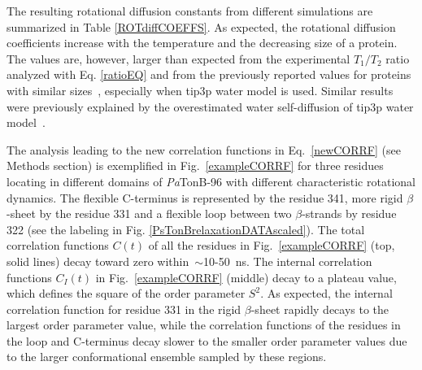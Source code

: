 \documentclass[journal=jpcbfk,manuscript=article]{achemso}
\begin{document}
The resulting rotational diffusion constants from different simulations are
summarized in Table \ref{ROTdiffCOEFFS}.
As expected, the rotational diffusion coefficients
increase with the temperature and the decreasing size of a protein.
The values are, however, larger than 
expected from the experimental $T_1/T_2$ ratio analyzed with Eq. \ref{ratioEQ}
and from the previously reported values for proteins with similar
sizes~\cite{krishnan98}, especially when tip3p water model is used.
Similar results were previously explained by the overestimated water
self-diffusion of tip3p water model~\cite{wong08,takemura12,debiec16}.

The analysis leading to the new correlation functions in Eq.~\ref{newCORRF}
(see Methods section) is exemplified in
Fig.~\ref{exampleCORRF} for three residues locating in different domains of {\it Pa}TonB-96
with different characteristic rotational dynamics.
The flexible C-terminus is represented by the residue 341,
more rigid $\beta$-sheet by the residue 331 and a
flexible loop between two $\beta$-strands by residue 322
(see the labeling in Fig. \ref{PsTonBrelaxationDATAscaled}). 
The total correlation functions $C(t)$
of all the residues in Fig.~\ref{exampleCORRF}  (top, solid lines) 
decay toward zero within~$\sim$10-50~ns.
The internal correlation functions $C_I(t)$ in Fig.~\ref{exampleCORRF} (middle)
decay to a plateau value, which defines the square of the order parameter $S^2$.
As expected, the internal correlation function for residue 331 in the
rigid $\beta$-sheet rapidly decays to the largest order parameter value,
while the correlation functions of the residues in the loop and C-terminus 
decay slower to the smaller order parameter values due to the larger conformational ensemble
sampled by these regions.
\end{document}
